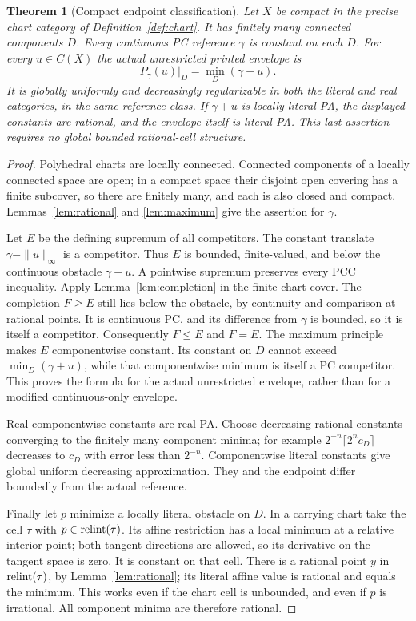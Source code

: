 \documentclass[11pt]{article}
\newtheorem{theorem}{Theorem}[section]
\theoremstyle{definition}\newtheorem{definition}[theorem]{Definition}
\theoremstyle{remark}\newtheorem{remark}[theorem]{Remark}
\begin{document}
\begin{theorem}[Compact endpoint classification]\label{thm:compact}
Let $X$ be compact in the precise chart category of Definition~\ref{def:chart}. It has finitely many connected components $D$. Every continuous PC reference $\gamma$ is constant on each $D$. For every $u\in C(X)$ the actual unrestricted printed envelope is
\[
 P_\gamma(u)|_D=\min_D(\gamma+u).
\]
It is globally uniformly and decreasingly regularizable in both the literal and real categories, in the same reference class. If $\gamma+u$ is locally literal PA, the displayed constants are rational, and the envelope itself is literal PA. This last assertion requires no global bounded rational-cell structure.
\end{theorem}
\begin{proof}
Polyhedral charts are locally connected. Connected components of a locally connected space are open; in a compact space their disjoint open covering has a finite subcover, so there are finitely many, and each is also closed and compact. Lemmas~\ref{lem:rational} and \ref{lem:maximum} give the assertion for $\gamma$.

Let $E$ be the defining supremum of all competitors. The constant translate $\gamma-\|u\|_\infty$ is a competitor. Thus $E$ is bounded, finite-valued, and below the continuous obstacle $\gamma+u$. A pointwise supremum preserves every PCC inequality. Apply Lemma~\ref{lem:completion} in the finite chart cover. The completion $F\geq E$ still lies below the obstacle, by continuity and comparison at rational points. It is continuous PC, and its difference from $\gamma$ is bounded, so it is itself a competitor. Consequently $F\leq E$ and $F=E$. The maximum principle makes $E$ componentwise constant. Its constant on $D$ cannot exceed $\min_D(\gamma+u)$, while that componentwise minimum is itself a PC competitor. This proves the formula for the actual unrestricted envelope, rather than for a modified continuous-only envelope.

Real componentwise constants are real PA. Choose decreasing rational constants converging to the finitely many component minima; for example $2^{-n}\lceil2^n c_D\rceil$ decreases to $c_D$ with error less than $2^{-n}$. Componentwise literal constants give global uniform decreasing approximation. They and the endpoint differ boundedly from the actual reference.

Finally let $p$ minimize a locally literal obstacle on $D$. In a carrying chart take the cell $\tau$ with $p\in\operatorname{relint}(\tau)$. Its affine restriction has a local minimum at a relative interior point; both tangent directions are allowed, so its derivative on the tangent space is zero. It is constant on that cell. There is a rational point $y$ in $\operatorname{relint}(\tau)$, by Lemma~\ref{lem:rational}; its literal affine value is rational and equals the minimum. This works even if the chart cell is unbounded, and even if $p$ is irrational. All component minima are therefore rational.
\end{proof}
\end{document}
